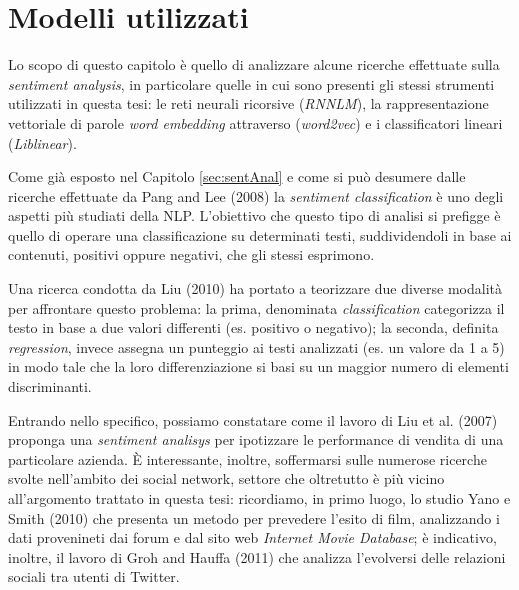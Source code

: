 \documentclass[a4paper,12pt,openright,twoside]{report}
\theoremstyle{definition}
\begin{document}
\chapter{Modelli utilizzati}

Lo scopo di questo capitolo è quello di analizzare alcune ricerche effettuate sulla 
\emph{sentiment analysis}, in particolare quelle in cui sono presenti gli stessi strumenti 
utilizzati in questa tesi: le reti neurali ricorsive (\emph{RNNLM}), 
la rappresentazione vettoriale di parole \emph{word embedding}
attraverso (\emph{word2vec}) e 
i classificatori lineari (\emph{Liblinear}).

Come già esposto nel Capitolo \ref{sec:sentAnal} e come si può desumere
dalle ricerche effettuate da Pang and Lee (2008) %
la \emph{sentiment classification} è uno degli aspetti più studiati della NLP.
L’obiettivo che questo tipo di analisi si prefigge è quello di operare una classificazione su determinati testi, suddividendoli in base ai contenuti, positivi oppure negativi, che gli stessi esprimono. 

Una ricerca condotta da 
Liu (2010) %
ha portato a teorizzare due diverse modalità per affrontare questo problema: la prima, denominata
 \emph{classification}
categorizza il testo in base a due valori differenti (es. positivo o negativo); la seconda, definita 
\emph{regression}, invece assegna un punteggio ai testi analizzati (es. un valore da 1 a 5)
in modo tale che la loro differenziazione si basi su un maggior numero di elementi discriminanti.

Entrando nello specifico, possiamo constatare come il lavoro di Liu et al. (2007) %
proponga una \emph{sentiment analisys} per ipotizzare le performance di vendita di una particolare
azienda. 
\`E interessante, inoltre, soffermarsi sulle numerose ricerche svolte nell’ambito dei social network, settore che oltretutto è più vicino all’argomento trattato in questa tesi: ricordiamo, in primo luogo,  lo studio 
Yano e Smith (2010) %
che presenta un metodo per prevedere l'esito di film, analizzando i dati
provenineti dai forum e dal sito web \emph{Internet Movie Database}; è indicativo, inoltre,
il lavoro di
Groh and Hauffa (2011) %
che analizza l’evolversi delle relazioni sociali tra utenti di Twitter.
\end{document}
